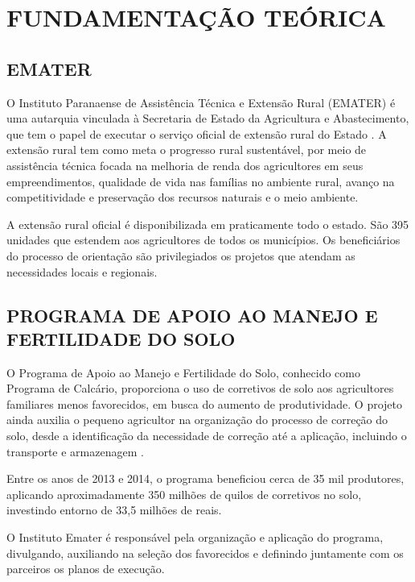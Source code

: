 
\chapter{FUNDAMENTAÇÃO TEÓRICA}
\label{chap:fundamentacao}

\section{EMATER}
\label{subsec:emater}

O Instituto Paranaense de Assistência Técnica e Extensão Rural (EMATER) é uma autarquia vinculada à Secretaria de Estado da Agricultura e Abastecimento, que tem o papel de executar o serviço oficial de extensão rural do Estado \cite{ematerAE}.
A extensão rural tem como meta o progresso rural sustentável, por meio de assistência técnica focada na melhoria de renda dos agricultores em seus empreendimentos, qualidade de vida nas famílias no ambiente rural, avanço na competitividade e preservação dos recursos naturais e o meio ambiente.

A extensão rural oficial é disponibilizada em praticamente todo o estado. São 395 unidades que estendem aos agricultores de todos os municípios. Os beneficiários do processo de orientação são privilegiados os projetos que atendam as necessidades locais e regionais.

\section{PROGRAMA DE APOIO AO MANEJO E FERTILIDADE DO SOLO}
\label{subsec:pamfs}

O Programa de Apoio ao Manejo e Fertilidade do Solo, conhecido como Programa de Calcário, proporciona o uso de corretivos de solo aos agricultores familiares menos favorecidos, em busca do aumento de produtividade. O projeto ainda auxilia o pequeno agricultor na organização do processo de correção do solo, desde a identificação da necessidade de correção até a aplicação, incluindo o transporte e armazenagem \cite{ematerPAMFS}.

Entre os anos de 2013 e 2014, o programa beneficiou cerca de 35 mil produtores, aplicando aproximadamente 350 milhões de quilos de corretivos no solo, investindo entorno de 33,5 milhões de reais.

O Instituto Emater é responsável pela organização e aplicação do programa, divulgando, auxiliando na seleção dos favorecidos e definindo juntamente com os parceiros os planos de execução.

